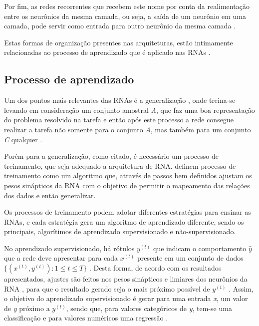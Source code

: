 \par Por fim, as redes recorrentes que recebem este nome por conta da realimentação entre os neurônios da mesma camada, ou seja, a saída de um neurônio em uma camada, pode servir como entrada para outro neurônio da mesma camada \cite{Nelson2017}.

\par Estas formas de organização presentes nas arquiteturas, estão intimamente relacionadas ao processo de aprendizado que é aplicado nas RNAs \cite{Haykin2001}.

\subsection{Processo de aprendizado}

\par Um dos pontos mais relevantes das RNAs é a generalização \cite{livroNunes2016}, onde treina-se levando em consideração um conjunto amostral \textit{A}, que faz uma boa representação do problema resolvido na tarefa e então após este processo a rede consegue realizar a tarefa não somente para o conjunto \textit{A}, mas também para um conjunto \textit{C} qualquer \cite{livroNunes2016}.

\par Porém para a generalização, como citado, é necessário um processo de treinamento, que seja adequado a arquitetura de RNA.  definem processo de treinamento como um algoritmo que, através de passos bem definidos ajustam os pesos sinápticos da RNA com o objetivo de permitir o mapeamento das relações dos dados e então generalizar. 

\par Os processos de treinamento podem adotar diferentes estratégias para ensinar as RNAs, e cada estratégia gera um algoritmo de aprendizado diferente, sendo os principais, algorítimos de aprendizado supervisionado e não-supervisionado.

\par No aprendizado supervisionado, há rótulos $y^{(t)}$ que indicam o comportamento $\widehat{y}$ que a rede deve apresentar para cada $x^{(t)}$ presente em um conjunto de dados $\{(x^{(t)}, y^{(t)}): 1 \leqslant t \leqslant T\}$ \cite{bezerra2016}. Desta forma, de acordo com os resultados apresentados, ajustes são feitos nos pesos sinápticos e limiares dos neurônios da RNA \cite{livroNunes2016}, para que o resultado gerado seja o mais próximo possível de $y^{(t)}$ \cite{Osorio1999}. Assim, o objetivo do aprendizado supervisionado é gerar para uma entrada \textit{x}, um valor de \textit{y} próximo a $y^{(t)}$, sendo que, para valores categóricos de \textit{y}, tem-se uma classificação e para valores numéricos uma regressão \cite{murphy2012}.

